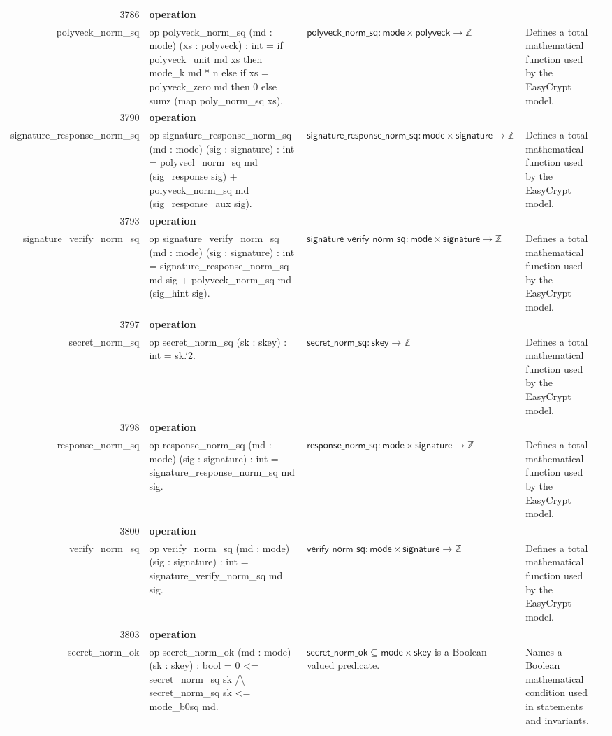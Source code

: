 \documentclass[10pt]{article}
\newcommand{\ec}[1]{\begingroup\ttfamily\scriptsize #1\endgroup}
\begin{document}
\begin{longtable}{r L{0.17\textwidth} L{0.26\textwidth} L{0.27\textwidth} L{0.20\textwidth}}
3786 & \textbf{operation}\\\ec{polyveck\_norm\_sq} & \ec{op polyveck\_norm\_sq (md : mode) (xs : polyveck) : int = if polyveck\_unit md xs then mode\_k md * n else if xs = polyveck\_zero md then 0 else sumz (map poly\_norm\_sq xs).} & \(\mathsf{polyveck\_norm\_sq} : \mathsf{mode} \times \mathsf{polyveck} \to \mathbb{Z}\) & Defines a total mathematical function used by the EasyCrypt model. \\
3790 & \textbf{operation}\\\ec{signature\_response\_norm\_sq} & \ec{op signature\_response\_norm\_sq (md : mode) (sig : signature) : int = polyvecl\_norm\_sq md (sig\_response sig) + polyveck\_norm\_sq md (sig\_response\_aux sig).} & \(\mathsf{signature\_response\_norm\_sq} : \mathsf{mode} \times \mathsf{signature} \to \mathbb{Z}\) & Defines a total mathematical function used by the EasyCrypt model. \\
3793 & \textbf{operation}\\\ec{signature\_verify\_norm\_sq} & \ec{op signature\_verify\_norm\_sq (md : mode) (sig : signature) : int = signature\_response\_norm\_sq md sig + polyveck\_norm\_sq md (sig\_hint sig).} & \(\mathsf{signature\_verify\_norm\_sq} : \mathsf{mode} \times \mathsf{signature} \to \mathbb{Z}\) & Defines a total mathematical function used by the EasyCrypt model. \\
3797 & \textbf{operation}\\\ec{secret\_norm\_sq} & \ec{op secret\_norm\_sq (sk : skey) : int = sk.`2.} & \(\mathsf{secret\_norm\_sq} : \mathsf{skey} \to \mathbb{Z}\) & Defines a total mathematical function used by the EasyCrypt model. \\
3798 & \textbf{operation}\\\ec{response\_norm\_sq} & \ec{op response\_norm\_sq (md : mode) (sig : signature) : int = signature\_response\_norm\_sq md sig.} & \(\mathsf{response\_norm\_sq} : \mathsf{mode} \times \mathsf{signature} \to \mathbb{Z}\) & Defines a total mathematical function used by the EasyCrypt model. \\
3800 & \textbf{operation}\\\ec{verify\_norm\_sq} & \ec{op verify\_norm\_sq (md : mode) (sig : signature) : int = signature\_verify\_norm\_sq md sig.} & \(\mathsf{verify\_norm\_sq} : \mathsf{mode} \times \mathsf{signature} \to \mathbb{Z}\) & Defines a total mathematical function used by the EasyCrypt model. \\
3803 & \textbf{operation}\\\ec{secret\_norm\_ok} & \ec{op secret\_norm\_ok (md : mode) (sk : skey) : bool = 0 <= secret\_norm\_sq sk /\textbackslash{} secret\_norm\_sq sk <= mode\_b0sq md.} & \(\mathsf{secret\_norm\_ok} \subseteq \mathsf{mode} \times \mathsf{skey}\) is a Boolean-valued predicate. & Names a Boolean mathematical condition used in statements and invariants. \\

\end{longtable}
\end{document}
